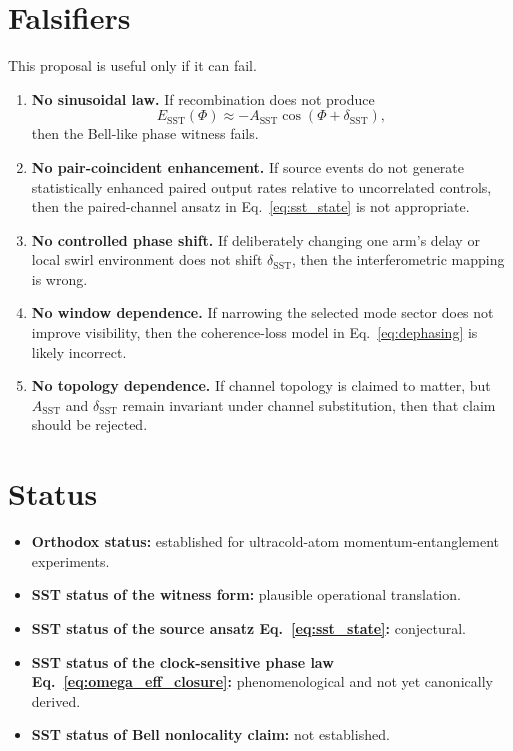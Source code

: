 \documentclass[11pt]{article}
\begin{document}
    \section{Falsifiers}
        
        This proposal is useful only if it can fail.
        
        \begin{enumerate}[label=\arabic*.]
\item \textbf{No sinusoidal law.} If recombination does not produce
\[
    E_{\mathrm{SST}}(\Phi)\approx -A_{\mathrm{SST}}\cos(\Phi+\delta_{\mathrm{SST}}),
\]
then the Bell-like phase witness fails.

\item \textbf{No pair-coincident enhancement.} If source events do not generate statistically enhanced paired output rates relative to uncorrelated controls, then the paired-channel ansatz in Eq.~\eqref{eq:sst_state} is not appropriate.

\item \textbf{No controlled phase shift.} If deliberately changing one arm's delay or local swirl environment does not shift \(\delta_{\mathrm{SST}}\), then the interferometric mapping is wrong.

\item \textbf{No window dependence.} If narrowing the selected mode sector does not improve visibility, then the coherence-loss model in Eq.~\eqref{eq:dephasing} is likely incorrect.

\item \textbf{No topology dependence.} If channel topology is claimed to matter, but \(A_{\mathrm{SST}}\) and \(\delta_{\mathrm{SST}}\) remain invariant under channel substitution, then that claim should be rejected.
        \end{enumerate}
    
    \section{Status}
        
        \begin{itemize}
            \item \textbf{Orthodox status:} established for ultracold-atom momentum-entanglement experiments.
            \item \textbf{SST status of the witness form:} plausible operational translation.
            \item \textbf{SST status of the source ansatz Eq.~\eqref{eq:sst_state}:} conjectural.
            \item \textbf{SST status of the clock-sensitive phase law Eq.~\eqref{eq:omega_eff_closure}:} phenomenological and not yet canonically derived.
            \item \textbf{SST status of Bell nonlocality claim:} not established.
        \end{itemize}
    
\end{document}
